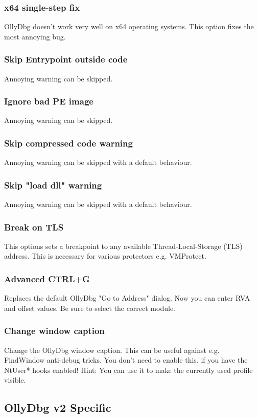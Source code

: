 \documentclass[10pt,a4paper]{article}
\begin{document}
\subsubsection{x64 single-step fix}
OllyDbg doesn't work very well on x64 operating systems. This option fixes the most annoying bug.
\subsubsection{Skip Entrypoint outside code}
Annoying warning can be skipped.
\subsubsection{Ignore bad PE image}
Annoying warning can be skipped.
\subsubsection{Skip compressed code warning}
Annoying warning can be skipped with a default behaviour.
\subsubsection{Skip "load dll" warning}
Annoying warning can be skipped with a default behaviour.
\subsubsection{Break on TLS}
This options sets a breakpoint to any available Thread-Local-Storage (TLS) address. This is necessary for various protectors e.g. VMProtect.
\subsubsection{Advanced CTRL+G}
Replaces the default OllyDbg "Go to Address" dialog. Now you can enter RVA and offset values. Be sure to select the correct module.
\subsubsection{Change window caption}
Change the OllyDbg window caption. This can be useful against e.g. FindWindow anti-debug tricks. You don't need to enable this, if you have the NtUser* hooks enabled! Hint: You can use it to make the currently used profile visible.


\subsection{OllyDbg v2 Specific}
\end{document}
